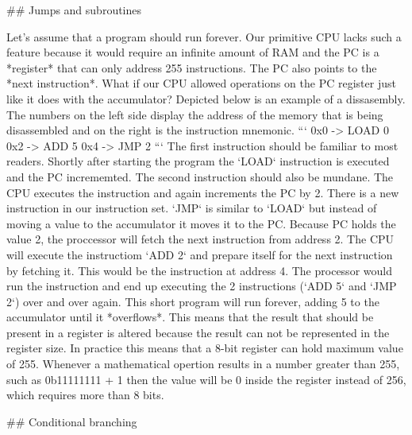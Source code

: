 ## Jumps and subroutines

Let's assume that a program should run forever. Our primitive CPU lacks such a feature because it
would require an infinite amount of RAM and the PC is a *register* that can only address 255 
instructions. The PC also points to the *next instruction*. What if our CPU allowed operations on
the PC register just like it does with the accumulator? Depicted below is an example of a 
dissasembly. The numbers on the left side display the address of the memory that is being
disassembled and on the right is the instruction mnemonic.
```
0x0 -> LOAD 0
0x2 -> ADD 5
0x4 -> JMP 2
```
The first instruction should be familiar to most readers. Shortly after starting the program the 
`LOAD` instruction is executed and the PC incrememted. The second instruction should also be mundane.
The CPU executes the instruction and again increments the PC by 2. There is a new instruction in our 
instruction set. `JMP` is similar to `LOAD` but instead of
moving a value to the accumulator it moves it to the PC. Because PC holds the value 2, the
proccessor will fetch the next instruction from address 2. The CPU will execute the instructiom
`ADD 2` and prepare itself for the next instruction by fetching it. This would be the instruction
at address 4. The processor would run the instruction and end up executing the 2 instructions
(`ADD 5` and `JMP 2`) over and over again. This short program will run forever, adding 5 to the
accumulator until it *overflows*. This means that the result that should be present in a register
is altered because the result can not be represented in the register size. In practice this means
that a 8-bit register can hold maximum value of 255. Whenever a mathematical opertion results in a 
number greater than 255, such as 0b11111111 + 1 then the value will be 0 inside the register instead
of 256, which requires more than 8 bits.

## Conditional branching

